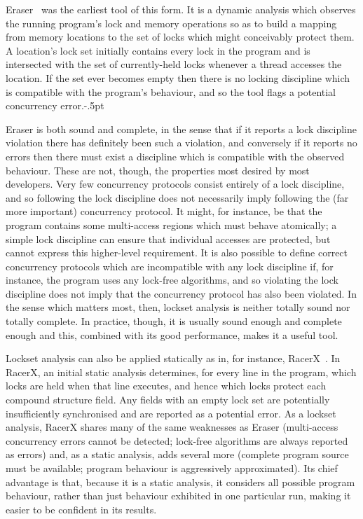 Eraser~\cite{Savage1997} was the earliest tool of this form.  It is a
dynamic analysis which observes the running program's lock and memory
operations so as to build a mapping from memory locations to the set
of locks which might conceivably protect them.  A location's lock set
initially contains every lock in the program and is intersected with
the set of currently-held locks whenever a thread accesses the
location.  If the set ever becomes empty then there is no locking
discipline which is compatible with the program's behaviour, and so
the tool flags a potential concurrency error.\kern-.5pt

Eraser is both sound and complete, in the sense that if it reports a
lock discipline violation there has definitely been such a violation,
and conversely if it reports no errors then there must exist a
discipline which is compatible with the observed behaviour.  These are
not, though, the properties most desired by most developers.  Very few
concurrency protocols consist entirely of a lock discipline, and so
following the lock discipline does not necessarily imply following the
(far more important) concurrency protocol.  It might, for instance, be
that the program contains some multi-access regions which must behave
atomically; a simple lock discipline can ensure that individual
accesses are protected, but cannot express this higher-level
requirement.  It is also possible to define correct concurrency
protocols which are incompatible with any lock discipline if, for
instance, the program uses any lock-free algorithms, and so violating
the lock discipline does not imply that the concurrency protocol has
also been violated.  In the sense which matters most, then, lockset
analysis is neither totally sound nor totally complete.  In practice,
though, it is usually sound enough and complete enough and this,
combined with its good performance, makes it a useful tool.

Lockset analysis can also be applied statically as in, for instance,
RacerX~\cite{Engler2003}.  In RacerX, an initial static analysis
determines, for every line in the program, which locks are held when
that line executes, and hence which locks protect each compound
structure field.  Any fields with an empty lock set are potentially
insufficiently synchronised and are reported as a potential error.  As
a lockset analysis, RacerX shares many of the same weaknesses as
Eraser (multi-access concurrency errors cannot be detected; lock-free
algorithms are always reported as errors) and, as a static analysis,
adds several more (complete program source must be available; program
behaviour is aggressively approximated).  Its chief advantage is that,
because it is a static analysis, it considers all possible program
behaviour, rather than just behaviour exhibited in one particular run,
making it easier to be confident in its results.

